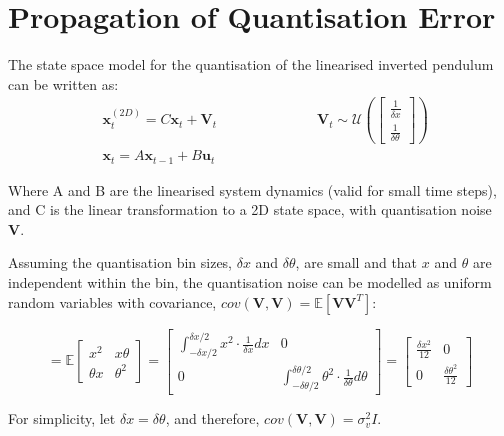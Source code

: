\documentclass[../main.tex]{subfiles}
\begin{document}
\section{Propagation of Quantisation Error}{
\label{appendix:quant}
{
\newcommand{\bx}{\boldsymbol{x}}
\newcommand{\bu}{\boldsymbol{u}}

The state space model for the quantisation of the linearised inverted pendulum can be written as:
\begin{align}
    \label{equ:stateequsapp}
&\bx_t^{(2D)} = C\bx_t + \boldsymbol{V}_t \hspace{3cm} \boldsymbol{V}_t \sim \mathcal{U} \left(\begin{bmatrix} \frac{1}{\delta x} \\ \frac{1}{\delta \theta} \end{bmatrix} \right) \\
    &\bx_t = A \bx_{t-1} + B\bu_t
\end{align}

Where A and B are the linearised system dynamics (valid for small time steps), and C is the linear transformation to a 2D state space, with quantisation noise \textbf{V}.

Assuming the quantisation bin sizes, $\delta x$ and $\delta \theta$, are small and that $x$ and $\theta$ are independent within the bin, the quantisation noise can be modelled as uniform random variables with covariance, $cov(\boldsymbol{V}, \boldsymbol{V}) = \mathbb{E}[\boldsymbol{V}\boldsymbol{V}^T]$:

\begin{equation}
= \mathbb{E} \begin{bmatrix} x^2 & x \theta \\ \theta x & \theta^2 \end{bmatrix} 
= \begin{bmatrix} \int^{\delta x/2}_{-\delta x/2} x^2 \cdot \frac{1}{\delta x} dx & 0 \\ 0 & \int^{\delta \theta/2}_{-\delta \theta/2} \theta^2 \cdot \frac{1}{\delta \theta} d\theta \end{bmatrix} 
= \begin{bmatrix} \frac{\delta x^2}{12} & 0 \\ 0 & \frac{\delta \theta^2}{12} \end{bmatrix}
\end{equation}

For simplicity, let $\delta x = \delta \theta$, and therefore, $cov(\boldsymbol{V}, \boldsymbol{V}) = \sigma_v^2 I$.


}}
\end{document}
